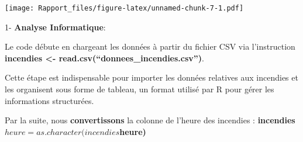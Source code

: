 \documentclass[
]{article}
\newenvironment{Shaded}{\begin{snugshade}}{\end{snugshade}}
\newcommand{\AttributeTok}[1]{\textcolor[rgb]{0.13,0.29,0.53}{#1}}
\newcommand{\DecValTok}[1]{\textcolor[rgb]{0.00,0.00,0.81}{#1}}
\newcommand{\FloatTok}[1]{\textcolor[rgb]{0.00,0.00,0.81}{#1}}
\newcommand{\FunctionTok}[1]{\textcolor[rgb]{0.13,0.29,0.53}{\textbf{#1}}}
\newcommand{\NormalTok}[1]{#1}
\newcommand{\OtherTok}[1]{\textcolor[rgb]{0.56,0.35,0.01}{#1}}
\newcommand{\SpecialCharTok}[1]{\textcolor[rgb]{0.81,0.36,0.00}{\textbf{#1}}}
\newcommand{\StringTok}[1]{\textcolor[rgb]{0.31,0.60,0.02}{#1}}
\begin{document}
\begin{Shaded}
\end{Shaded}

\texttt{[image: Rapport\_files/figure-latex/unnamed-chunk-7-1.pdf]}

1- \textbf{Analyse Informatique}:

Le code débute en chargeant les données à partir du fichier CSV via
l'instruction \textbf{incendies \textless-
read.csv(``donnees\_incendies.csv'')}.

Cette étape est indispensable pour importer les données relatives aux
incendies et les organisent sous forme de tableau, un format utilisé par
R pour gérer les informations structurées.

Par la suite, nous \textbf{convertissons} la colonne de l'heure des
incendies : \textbf{incendies\(heure = as.character(incendies\)heure)}
\end{document}
